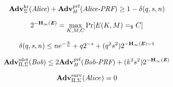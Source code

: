 $$\mathbf{Adv}^{\text{kr}}_{\Sigma}(\emph{Alice})+\mathbf{Adv}_H^{\text{prf}}(\emph{Alice-PRF})\ge 1 - \delta(q,s,n)$$

$$2^{-\textbf{H}_\infty(\textbf{\emph{E}})} = \max_{K,M,C} \Pr[E(K,M)=_\$C]$$

$$\delta(q,s,n) \le ne^{-\frac{q}{n}}+q2^{-s} + (q^2s^2)2^{-\textbf{H}_\infty(\textbf{\emph{E}})-1}$$

$$\mathbf{Adv}^{\text{sdet}}_{\Pi,\Sigma} (\emph{Bob}) \le 2\mathbf{Adv}^{\text{prf}}_{H} (\emph{Bob-PRF}) + (k^2s^2)2^{-\textbf{H}_\infty(\textbf{\emph{E}})} $$

$$\mathbf{Adv}^\text{surv}_{\Pi,\Sigma}(Alice)=0$$


